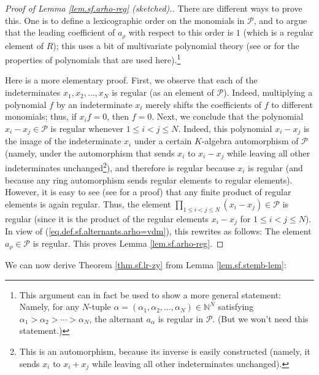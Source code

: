 \begin{proof}
[Proof of Lemma \ref{lem.sf.arho-reg} (sketched).]There are different ways to
prove this. One is to define a lexicographic order on the monomials in
$\mathcal{P}$, and to argue that the leading coefficient of $a_{\rho}$ with
respect to this order is $1$ (which is a regular element of $R$); this uses a
bit of multivariate polynomial theory (see \cite[Theorem 40.7]{Warner90} or
\cite[Proposition 6.2.10]{23wa} for the properties of polynomials that are
used here).\footnote{This argument can in fact be used to show a more general
statement: Namely, for any $N$-tuple $\alpha=\left(  \alpha_{1},\alpha
_{2},\ldots,\alpha_{N}\right)  \in\mathbb{N}^{N}$ satisfying $\alpha
_{1}>\alpha_{2}>\cdots>\alpha_{N}$, the alternant $a_{\alpha}$ is regular in
$\mathcal{P}$. (But we won't need this statement.)}

Here is a more elementary proof. First, we observe that each of the
indeterminates $x_{1},x_{2},\ldots,x_{N}$ is regular (as an element of
$\mathcal{P}$). Indeed, multiplying a polynomial $f$ by an indeterminate
$x_{i}$ merely shifts the coefficients of $f$ to different monomials; thus, if
$x_{i}f=0$, then $f=0$. Next, we conclude that the polynomial $x_{i}-x_{j}%
\in\mathcal{P}$ is regular whenever $1\leq i<j\leq N$. Indeed, this polynomial
$x_{i}-x_{j}$ is the image of the indeterminate $x_{i}$ under a certain
$K$-algebra automorphism of $\mathcal{P}$ (namely, under the automorphism that
sends $x_{i}$ to $x_{i}-x_{j}$ while leaving all other indeterminates
unchanged\footnote{This is an automorphism, because its inverse is easily
constructed (namely, it sends $x_{i}$ to $x_{i}+x_{j}$ while leaving all other
indeterminates unchanged).}), and therefore is regular because $x_{i}$ is
regular (and because any ring automorphism sends regular elements to regular
elements). However, it is easy to see (see \cite[Proposition 2.3]{regpol} for
a proof) that any finite product of regular elements is again regular. Thus,
the element $\prod_{1\leq i<j\leq N}\left(  x_{i}-x_{j}\right)  \in
\mathcal{P}$ is regular (since it is the product of the regular elements
$x_{i}-x_{j}$ for $1\leq i<j\leq N$). In view of
(\ref{eq.def.sf.alternants.arho=vdm}), this rewrites as follows: The element
$a_{\rho}\in\mathcal{P}$ is regular. This proves Lemma \ref{lem.sf.arho-reg}.
\end{proof}

We can now derive Theorem \ref{thm.sf.lr-zy} from Lemma \ref{lem.sf.stemb-lem}:

